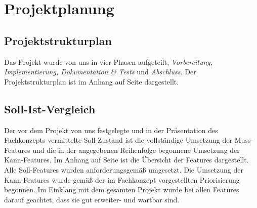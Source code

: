 

\section{Projektplanung}

\subsection{Projektstrukturplan}
Das Projekt wurde von uns in vier Phasen aufgeteilt, \textit{Vorbereitung, Implementierung, Dokumentation \& Tests} und \textit{Abschluss.}
Der Projektstrukturplan ist im Anhang auf Seite \pageref{PSP} dargestellt.

\subsection{Soll-Ist-Vergleich}
Der vor dem Projekt von uns festgelegte und in der Präsentation des Fachkonzepts vermittelte Soll-Zustand ist die vollständige Umsetzung der Muss-Features und die in der angegebenen Reihenfolge begonnene Umsetzung der Kann-Features.
Im Anhang auf Seite \pageref{PM_SOLLIST} ist die Übersicht der Features dargestellt. Alle Soll-Features wurden anforderungsgemäß umgesetzt. Die Umsetzung der Kann-Features wurde gemäß der im Fachkonzept vorgestellten Priorisierung begonnen. Im Einklang mit dem gesamten Projekt wurde bei allen Features darauf geachtet, dass sie gut erweiter- und wartbar sind. 